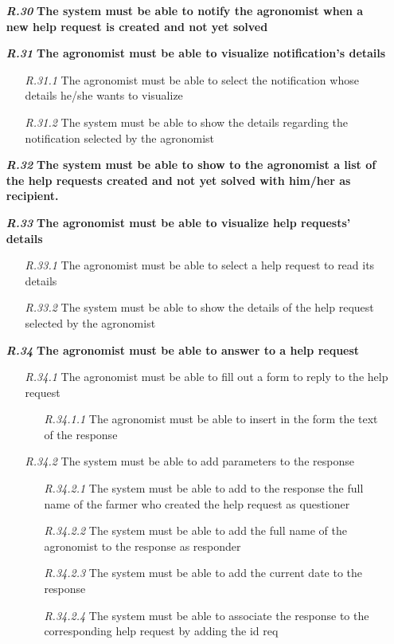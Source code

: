 \begin{itemize}
\item [\textbf{\textit{R.30}}] \textbf{The system must be able to notify the agronomist when a new help request is created and not yet solved}
\item [\textbf{\textit{R.31}}] \textbf{The agronomist must be able to visualize notification’s details}
        \begin{itemize}
            \item [\textit{R.31.1}] The agronomist must be able to select the notification whose details he/she wants to visualize
            \item [\textit{R.31.2}] The system must be able to show the details regarding the notification selected by the agronomist
        \end{itemize}
        \item [\textbf{\textit{R.32}}] \textbf{The system must be able to show to the agronomist a list of the help requests created and not yet solved with him/her as recipient.}
        \item [\textbf{\textit{R.33}}]\textbf{ The agronomist must be able to visualize help requests' details}
        \begin{itemize}
            \item [\textit{R.33.1}] The agronomist must be able to select a help request to read its details
            \item [\textit{R.33.2}] The system must be able to show the details of the help request selected by the agronomist
        \end{itemize}
        \item [\textbf{\textit{R.34}}] \textbf{The agronomist must be able to answer to a help request}
        \begin{itemize}
            \item [\textit{R.34.1}] The agronomist must be able to fill out a form to reply to the help request
            \begin{itemize}
                \item [\textit{R.34.1.1}] The agronomist must be able to insert in the form the text of the response
            \end{itemize}
            \item [\textit{R.34.2}] The system must be able to add parameters to the response
            \begin{itemize}
                \item [\textit{R.34.2.1}] The system must be able to add to the response the full name of the farmer who created the help request as questioner
                \item [\textit{R.34.2.2}] The system must be able to add the full name of the agronomist to the response as responder
		        \item [\textit{R.34.2.3}] The system must be
		        able to add the current date to the response
		        \item [\textit{R.34.2.4}] The system must be able to associate the response to the corresponding help request by adding the id req
            \end{itemize}
        \end{itemize}



\end{itemize}
